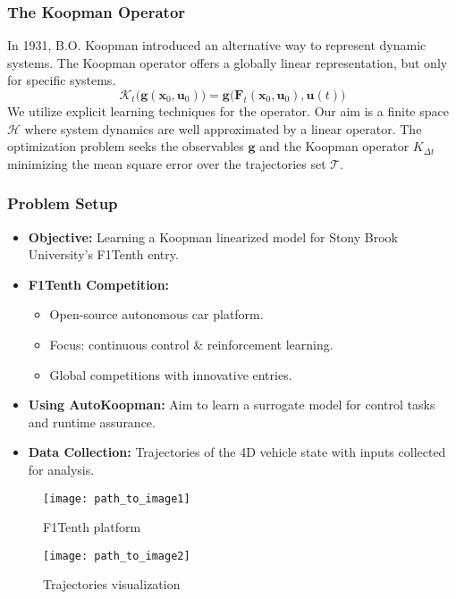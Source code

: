 \documentclass[shortpres,aspectratio=43]{beamer}
\begin{document}
\begin{frame}
\frametitle{The Koopman Operator}
In 1931, B.O. Koopman introduced an alternative way to represent dynamic systems. The Koopman operator offers a globally linear representation, but only for specific systems.
\pause
\[
\mathcal{K}_{t} \big(\mathbf{g} (\mathbf{x}_0, \mathbf{u}_0)\big) = \mathbf{g} \big(\mathbf{F}_{t}(\mathbf{x}_0,  \mathbf{u}_0 ), \mathbf{u}(t) \big)
\]
\pause
We utilize explicit learning techniques for the operator. Our aim is a finite space $\mathcal{H}$ where system dynamics are well approximated by a linear operator.
\pause
The optimization problem seeks the observables $\mathbf{g}$ and the Koopman operator $K_{\Delta t}$ minimizing the mean square error over the trajectories set $\mathcal{T}$.
\end{frame}


\begin{frame}
\frametitle{Problem Setup}
\begin{itemize}
    \item<1-> \textbf{Objective:} Learning a Koopman linearized model for Stony Brook University's F1Tenth entry.
    \item<2-> \textbf{F1Tenth Competition:}
    \begin{itemize}
        \item Open-source autonomous car platform.
        \item Focus: continuous control \& reinforcement learning.
        \item Global competitions with innovative entries.
    \end{itemize}
    \item<3-> \textbf{Using AutoKoopman:} Aim to learn a surrogate model for control tasks and runtime assurance.
    \item<4-> \textbf{Data Collection:} Trajectories of the 4D vehicle state with inputs collected for analysis.
\end{itemize}
\begin{figure}
  \centering
  \texttt{[image: path\_to\_image1]} %
  \caption{F1Tenth platform}
\end{figure}
\begin{figure}
  \centering
  \texttt{[image: path\_to\_image2]} %
  \caption{Trajectories visualization}
\end{figure}
\end{frame}
\end{document}
